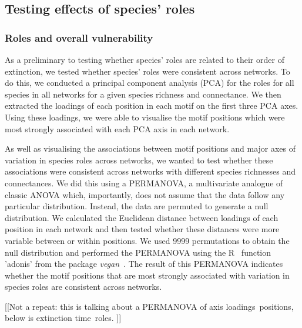 \documentclass[12pt]{article}
\begin{document}
	\subsection*{Testing effects of species' roles}

		\subsubsection*{Roles and overall vulnerability}

			As a preliminary to testing whether species' roles are related to their order of extinction, we tested whether species' roles were consistent across networks. To do this, we conducted a principal component analysis (PCA) for the roles for all species in all networks for a given species richness and connectance. We then extracted the loadings of each position in each motif on the first three PCA axes. Using these loadings, we were able to visualise the motif positions which were most strongly associated with each PCA axis in each network.


			As well as visualising the associations between motif positions and major axes of variation in species roles across networks, we wanted to test whether these associations were consistent across networks with different species richnesses and connectances. We did this using a PERMANOVA, a multivariate analogue of classic ANOVA which, importantly, does not assume that the data follow any particular distribution. Instead, the data are permuted to generate a null distribution. We calculated the Euclidean distance between loadings of each position in each network and then tested whether these distances were more variable between or within positions.  We used 9999 permutations to obtain the null distribution and performed the PERMANOVA using the R~\citep{R} function 'adonis' from the package \emph{vegan}~\citep{vegan}. The result of this PERMANOVA indicates whether the motif positions that are most strongly associated with variation in species roles are consistent across networks.


			[[Not a repeat: this is talking about a PERMANOVA of axis loadings~positions, below is extinction time~roles. ]]
\end{document}
